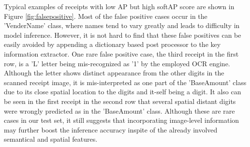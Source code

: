 \documentclass[10pt,twocolumn,letterpaper]{article}
\begin{document}
Typical examples of receipts with low AP but high softAP score are shown in Figure \ref{fig:falsepositive}. Most of the false positive cases occur in the 'VenderName' class, where names tend to vary greatly and leads to difficulty in model inference. However, it is not hard to find that these false positives can be easily avoided by appending a dictionary based post processor to the key information extractor. One rare false positive case, the third receipt in the first row, is a 'L' letter being mis-recognized as '1' by the employed OCR engine. Although the letter shows distinct appearance from the other digits in the scanned receipt image, it is mis-interpreted as one part of the 'BaseAmount' class due to its close spatial location to the digits and it-self being a digit. It also can be seen in the first receipt in the second row that several spatial distant digits were wrongly predicted as in the 'BaseAmount' class. Although these are rare cases in our test set, it still suggests that incorporating image-level information may further boost the inference accuracy inspite of the already involved semantical and spatial features. 
\end{document}
